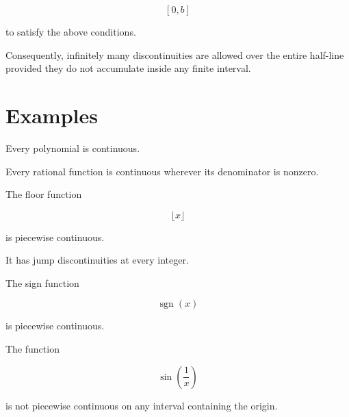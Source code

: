 \documentclass{essay}
\begin{document}
\[ [0,b] \]

to satisfy the above conditions.

Consequently, infinitely many discontinuities are allowed over the entire
half-line provided they do not accumulate inside any finite interval.


\section{Examples}

\begin{example}

  Every polynomial is continuous.

\end{example}

\begin{example}

  Every rational function is continuous wherever its denominator is nonzero.

\end{example}

\begin{example}

  The floor function

  \[ \lfloor x\rfloor \]

  is piecewise continuous.

  It has jump discontinuities at every integer.

\end{example}

\begin{example}

  The sign function

  \[ \operatorname{sgn}(x) \]

  is piecewise continuous.

\end{example}

\begin{example}

  The function

  \[ \sin\left(\frac{1}{x}\right) \]

  is not piecewise continuous on any interval containing the origin.

\end{example}

\end{document}
